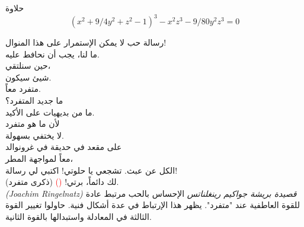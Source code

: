 \begin{surferPage}{حلاوة}
\[(x^2+ 9/4y^2	+ z^2- 1)^3- x^2z^3	- 9/80y^2z^3	= 0\]

\singlespacing
رسالة حب
\singlespacing
لا يمكن الإستمرار على هذا المنوال!\\
ما لنا، يجب أن نحافط عليه.\\
حين سنلتقي،\\
شيئ سيكون.\\
متفرد معاً. \\
ما جديد المتفرد؟\\
ما من بديهيات على الأكيد.\\
لأن ما هو متفرد\\
لا يختفي بسهولة.\\
على مقعد في حديقة في غرونوالد\\
معاً لمواجهة المطر،\\
الكل عن عبث. تشجعي يا حلوتي! اكتبي لي رسالة!\\
لك دائماً، برتي! \textcolor{red}{()}
 (ذكرى متفرد).\\
\textit{\textenglish{(Joachim Ringelnatz)} قصيدة بريشة جواكيم رينغلناتس}
\singlespacing
الإحساس بالحب مرتبط عادة للقوة العاطفية عند "متفرد". يظهر هذا الإرتباط في عدة أشكال فنية.
\singlespacing
حاولوا تغيير القوة الثالثة في المعادلة واستبدالها بالقوة الثانية.
\end{surferPage}
